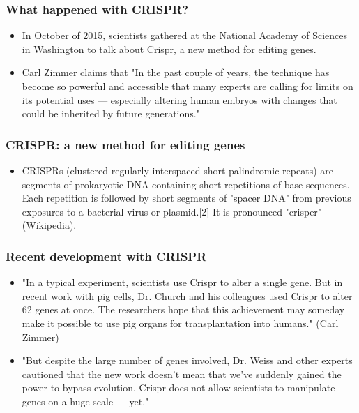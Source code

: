 \documentclass{beamer}
\begin{document}
\begin{frame}
\frametitle{What happened with CRISPR?}
\begin{itemize}
\item In October of 2015, scientists gathered at the National Academy of Sciences
in Washington to talk about Crispr, a new method for editing genes.
\item Carl Zimmer claims that "In the past couple of years, 
the technique has become so powerful and accessible that many experts are 
calling for limits on its potential uses — especially altering human 
embryos with changes that could be inherited by future generations."
\end{itemize}
\end{frame}
\begin{frame}
\frametitle{CRISPR: a new method for editing genes}
\begin{itemize}
\item 
CRISPRs (clustered regularly interspaced short palindromic repeats) are 
segments of prokaryotic DNA containing short repetitions of base sequences.
Each repetition is followed by short segments of "spacer DNA" from previous
exposures to a bacterial virus or plasmid.[2] It is pronounced "crisper" 
(Wikipedia).
\end{itemize}
\end{frame}


\begin{frame}
\frametitle{Recent development with CRISPR}
\begin{itemize}
\item "In a typical experiment, scientists use Crispr to alter a single gene.
 But in recent work with pig cells, Dr. Church and his colleagues used Crispr
 to alter 62 genes at once. The researchers hope that this achievement may
 someday make it possible to use pig organs for transplantation into humans." 
(Carl Zimmer) 
\item "But despite the large number of genes involved, 
Dr. Weiss and other experts cautioned that the 
new work doesn’t mean that we’ve suddenly gained the power to 
bypass evolution. Crispr does not allow scientists to manipulate 
genes on a huge scale — yet."

\end{itemize}
\end{frame}
\end{document}
